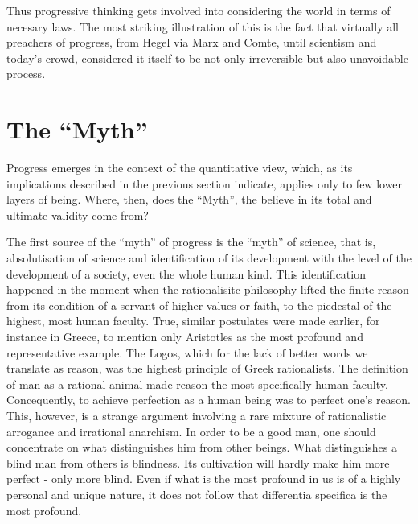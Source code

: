 Thus progressive thinking gets involved into considering the world in terms
of necesary laws. The most striking illustration of this is the fact that
virtually all preachers of progress, from Hegel via Marx and Comte, until scientism
and today's crowd, considered it itself to be not only irreversible but also 
unavoidable process.

\section{The ``Myth''}
Progress emerges in the context of the quantitative view,  which, 
as its implications described in the previous section indicate, applies only
to few lower layers of being. Where, then, does the ``Myth'', the believe in
its total and ultimate validity come from?

The first source of the ``myth'' of progress is the ``myth'' of science, that
is, absolutisation of science and identification of its development with the 
level of the development of a society, even the whole human kind. This
identification happened in the moment when the rationalisitc philosophy lifted
the finite reason from its condition of a servant of higher values or faith,
to the piedestal of the highest, most human faculty. True, similar postulates
were made earlier, for instance in Greece, to mention only Aristotles as the 
most profound and representative example. The Logos, which for the lack of 
better words we translate as reason, was the highest principle of Greek 
rationalists. The definition of man as a rational animal
made reason the most specifically human faculty. Concequently, to achieve 
perfection as a human being was to perfect one's reason. This, however, is a
strange argument involving a rare mixture of rationalistic arrogance and
irrational anarchism. In order to be a good man, one should concentrate on
what distinguishes him from other beings. What distinguishes a blind man from
others is blindness. Its cultivation will hardly make him more perfect - only
more blind. Even if what is the most profound in us is of a highly personal
and unique nature, it does not follow that differentia specifica is the most
profound.

